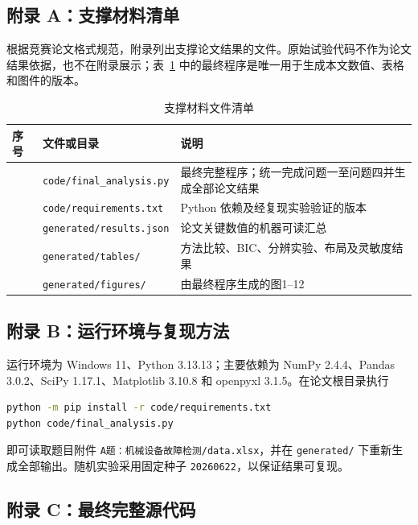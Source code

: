 \documentclass[withoutpreface,bwprint]{cumcmthesis}
\begin{document}
\subsection*{附录 A：支撑材料清单}

根据竞赛论文格式规范，附录列出支撑论文结果的文件。原始试验代码不作为论文结果依据，也不在附录展示；表~\ref{tab:support-files} 中的最终程序是唯一用于生成本文数值、表格和图件的版本。

\begin{table}[H]
\centering
\small
\renewcommand{\arraystretch}{1.2}
\caption{支撑材料文件清单}
\label{tab:support-files}
\begin{tabular}{>{\centering\arraybackslash}m{1.0cm} m{4.6cm} m{6.6cm}}
\toprule
序号 & 文件或目录 & 说明 \\
\midrule
1 & \texttt{code/final\_analysis.py} & 最终完整程序；统一完成问题一至问题四并生成全部论文结果 \\
2 & \texttt{code/requirements.txt} & Python 依赖及经复现实验验证的版本 \\
3 & \texttt{generated/results.json} & 论文关键数值的机器可读汇总 \\
4 & \texttt{generated/tables/} & 方法比较、BIC、分辨实验、布局及灵敏度结果 \\
5 & \texttt{generated/figures/} & 由最终程序生成的图1--12 \\
\bottomrule
\end{tabular}
\end{table}

\subsection*{附录 B：运行环境与复现方法}

运行环境为 Windows 11、Python 3.13.13；主要依赖为 NumPy 2.4.4、Pandas 3.0.2、SciPy 1.17.1、Matplotlib 3.10.8 和 openpyxl 3.1.5。在论文根目录执行
\begin{lstlisting}[language=bash,basicstyle=\ttfamily\small]
python -m pip install -r code/requirements.txt
python code/final_analysis.py
\end{lstlisting}
即可读取题目附件 \texttt{A题：机械设备故障检测/data.xlsx}，并在 \texttt{generated/} 下重新生成全部输出。随机实验采用固定种子 \texttt{20260622}，以保证结果可复现。

\subsection*{附录 C：最终完整源代码}


\end{document}
